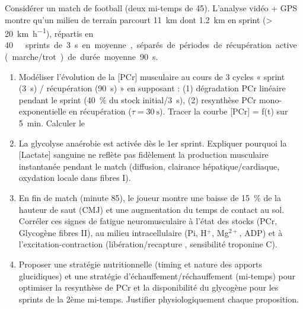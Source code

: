 \documentclass[11pt]{article}
\begin{document}
\begin{exercice}
Considérer un match de football (deux mi-temps de \SI{45}{\min}). L'analyse vidéo + GPS montre qu'un milieu de terrain parcourt \SI{11}{\kilo\metre} dont \SI{1,2}{\kilo\metre} en sprint (> \SI{20}{\kilo\metre\per\hour}), répartis en \SI{40}{~} sprints de \SI{3}{\second} en moyenne, séparés de périodes de récupération active (marche/trot) de durée moyenne \SI{90}{\second}.

\begin{enumerate}
    \item Modéliser l'évolution de la [PCr] musculaire au cours de 3 cycles « sprint (\SI{3}{\second}) / récupération (\SI{90}{\second}) » en supposant : (1) dégradation PCr linéaire pendant le sprint (\SI{40}{\%} du stock initial/\SI{3}{\second}), (2) resynthèse PCr mono-exponentielle en récupération ($\tau = \SI{30}{\second}$). Tracer la courbe [PCr] = f(t) sur \SI{5}{\minute}. Calculer le %
    \item La glycolyse anaérobie est activée dès le 1er sprint. Expliquer pourquoi la [Lactate] sanguine ne reflète pas fidèlement la production musculaire instantanée pendant le match (diffusion, clairance hépatique/cardiaque, oxydation locale dans fibres I).
    \item En fin de match (minute 85), le joueur montre une baisse de \SI{15}{\%} de la hauteur de saut (CMJ) et une augmentation du temps de contact au sol. Corréler ces signes de fatigue neuromusculaire à l'état des stocks (PCr, Glycogène fibres II), au milieu intracellulaire (Pi, H$^+$, Mg$^{2+}$, ADP) et à l'excitation-contraction (libération/recapture , sensibilité troponine C).
    \item Proposer une stratégie nutritionnelle (timing et nature des apports glucidiques) et une stratégie d'échauffement/réchauffement (mi-temps) pour optimiser la resynthèse de PCr et la disponibilité du glycogène pour les sprints de la 2ème mi-temps. Justifier physiologiquement chaque proposition.
\end{enumerate}
\end{exercice}
\end{document}

